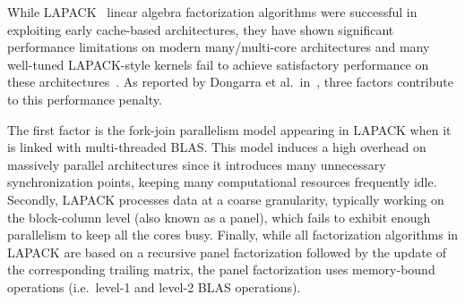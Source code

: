 While LAPACK~\cite{lug99} linear algebra factorization
algorithms were successful in exploiting early cache-based
architectures, they have shown significant performance
limitations on modern many/multi-core architectures and many
well-tuned LAPACK-style kernels
fail to achieve satisfactory performance on these
architectures~\cite{agullo2009comparative}.
As reported by Dongarra et al\@.~in~\cite{dongarra2011achieving},
three factors contribute to this
performance penalty.

The first factor is the fork-join parallelism
model appearing in LAPACK when it is linked with multi-threaded BLAS.
This model induces a high overhead on
massively parallel architectures since it introduces many unnecessary
synchronization points, keeping many computational resources frequently
idle.
Secondly, LAPACK processes data at a coarse granularity,
typically working on the block-column level (also known as a panel),
which fails to exhibit enough parallelism to
keep all the cores busy.
Finally, while all factorization algorithms in LAPACK are based on
a recursive panel factorization followed by the update of the
corresponding trailing matrix,
the panel factorization uses memory-bound operations
(i.e.\ level-1 and level-2 BLAS operations).

